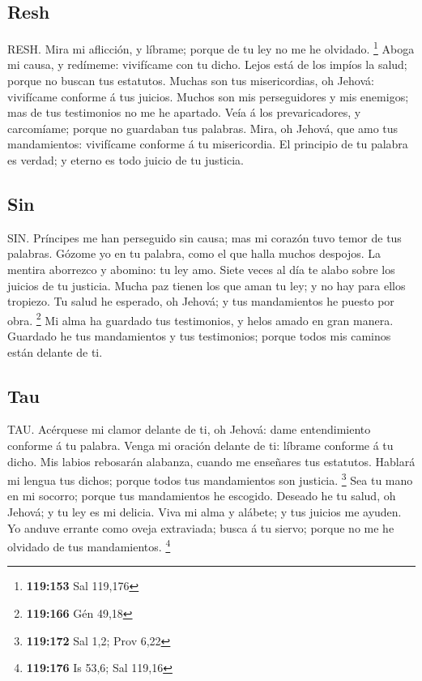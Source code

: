 \hypertarget{resh}{%
\subsection{Resh}\label{resh}}

 RESH. Mira mi aflicción, y líbrame; porque de tu ley no
me he olvidado. \footnote{\textbf{119:153} Sal 119,176} 
Aboga mi causa, y redímeme: vivifícame con tu dicho. 
Lejos está de los impíos la salud; porque no buscan tus estatutos.
 Muchas son tus misericordias, oh Jehová: vivifícame
conforme á tus juicios.  Muchos son mis perseguidores y
mis enemigos; mas de tus testimonios no me he apartado. 
Veía á los prevaricadores, y carcomíame; porque no guardaban tus
palabras.  Mira, oh Jehová, que amo tus mandamientos:
vivifícame conforme á tu misericordia.  El principio de tu
palabra es verdad; y eterno es todo juicio de tu justicia.

\hypertarget{sin}{%
\subsection{Sin}\label{sin}}

 SIN. Príncipes me han perseguido sin causa; mas mi
corazón tuvo temor de tus palabras.  Gózome yo en tu
palabra, como el que halla muchos despojos.  La mentira
aborrezco y abomino: tu ley amo.  Siete veces al día te
alabo sobre los juicios de tu justicia.  Mucha paz tienen
los que aman tu ley; y no hay para ellos tropiezo.  Tu
salud he esperado, oh Jehová; y tus mandamientos he puesto por obra.
\footnote{\textbf{119:166} Gén 49,18}  Mi alma ha guardado
tus testimonios, y helos amado en gran manera.  Guardado
he tus mandamientos y tus testimonios; porque todos mis caminos están
delante de ti.

\hypertarget{tau}{%
\subsection{Tau}\label{tau}}

 TAU. Acérquese mi clamor delante de ti, oh Jehová: dame
entendimiento conforme á tu palabra.  Venga mi oración
delante de ti: líbrame conforme á tu dicho.  Mis labios
rebosarán alabanza, cuando me enseñares tus estatutos. 
Hablará mi lengua tus dichos; porque todos tus mandamientos son
justicia. \footnote{\textbf{119:172} Sal 1,2; Prov 6,22} 
Sea tu mano en mi socorro; porque tus mandamientos he escogido.
 Deseado he tu salud, oh Jehová; y tu ley es mi delicia.
 Viva mi alma y alábete; y tus juicios me ayuden.
 Yo anduve errante como oveja extraviada; busca á tu
siervo; porque no me he olvidado de tus mandamientos. \footnote{\textbf{119:176}
  Is 53,6; Sal 119,16}

